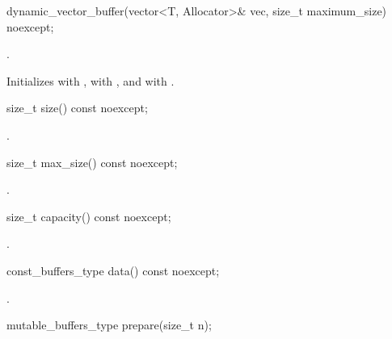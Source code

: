 %
\begin{itemdecl}
dynamic_vector_buffer(vector<T, Allocator>& vec,
                      size_t maximum_size) noexcept;
\end{itemdecl}

\begin{itemdescr}
\pnum
\changed{\requires}{\expects} .

\pnum
\effects Initializes  with ,  with , and  with .
\end{itemdescr}

%
\begin{itemdecl}
size_t size() const noexcept;
\end{itemdecl}

\begin{itemdescr}
\pnum
\returns {}.
\end{itemdescr}

%
\begin{itemdecl}
size_t max_size() const noexcept;
\end{itemdecl}

\begin{itemdescr}
\pnum
\returns {}.
\end{itemdescr}

%
\begin{itemdecl}
size_t capacity() const noexcept;
\end{itemdecl}

\begin{itemdescr}
\pnum
\returns {}.
\end{itemdescr}

%
\begin{itemdecl}
const_buffers_type data() const noexcept;
\end{itemdecl}

\begin{itemdescr}
\pnum
\returns {}.
\end{itemdescr}

%
\begin{itemdecl}
mutable_buffers_type prepare(size_t n);
\end{itemdecl}

